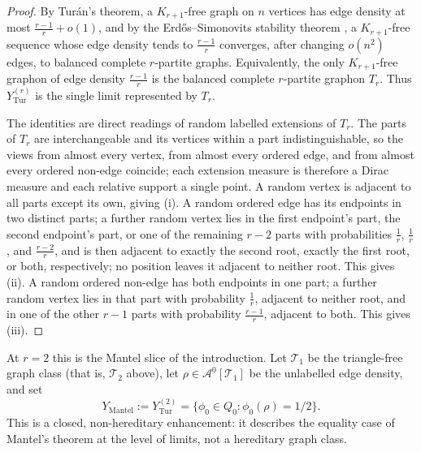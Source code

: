 \documentclass[11pt]{article}
\theoremstyle{definition}
\newcommand{\A}{\mathcal{A}}
\newcommand{\T}{\mathcal{T}}
\begin{document}
\begin{proof}
By Tur\'an's theorem, a $K_{r+1}$-free graph on $n$ vertices has edge density at most
$\frac{r-1}{r}+o(1)$, and by the Erd\H{o}s--Simonovits stability theorem
\cite{ErdosSimonovits,Simonovits1968}, a $K_{r+1}$-free sequence whose edge density
tends to $\frac{r-1}{r}$ converges, after changing $o(n^2)$ edges, to balanced complete
$r$-partite graphs.  Equivalently, the only $K_{r+1}$-free graphon of edge density
$\frac{r-1}{r}$ is the balanced complete $r$-partite graphon $T_r$.  Thus
$Y_{\mathrm{Tur}}^{(r)}$ is the single limit represented by $T_r$.

The identities are direct readings of random labelled extensions of $T_r$.  The parts of
$T_r$ are interchangeable and its vertices within a part indistinguishable, so the views
from almost every vertex, from almost every ordered edge, and from almost every ordered
non-edge coincide; each extension measure is therefore a Dirac measure and each relative
support a single point.  A random vertex is adjacent to all parts except its own, giving
(i).  A random ordered edge has its endpoints in two distinct parts; a further random
vertex lies in the first endpoint's part, the second endpoint's part, or one of the
remaining $r-2$ parts with probabilities $\frac1r$, $\frac1r$, and $\frac{r-2}r$, and is
then adjacent to exactly the second root, exactly the first root, or both, respectively;
no position leaves it adjacent to neither root.  This gives (ii).  A random ordered
non-edge has both endpoints in one part; a further random vertex lies in that part with
probability $\frac1r$, adjacent to neither root, and in one of the other $r-1$ parts
with probability $\frac{r-1}r$, adjacent to both.  This gives (iii).
\end{proof}

At $r=2$ this is the Mantel slice of the introduction.  Let $\T_1$ be the triangle-free
graph class (that is, $\T_2$ above), let $\rho\in\A^0[\T_1]$ be the unlabelled edge
density, and set
\[
  Y_{\mathrm{Mantel}}
  :=
  Y_{\mathrm{Tur}}^{(2)}
  =
  \{\phi_0\in Q_0:\phi_0(\rho)=1/2\}.
\]
This is a closed, non-hereditary enhancement: it describes the equality case of Mantel's
theorem at the level of limits, not a hereditary graph class.
\end{document}
